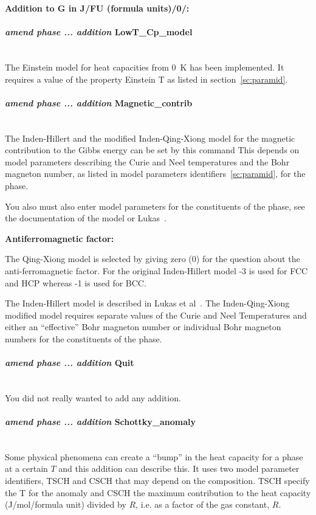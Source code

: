\documentclass[11pt]{article}
\newcommand{\subsubsubsection}[1]{\paragraph{#1}\mbox{}\\}
\begin{document}
{\bf Addition to G in J/FU (formula units)/0/:}

\hypertarget{Amend lowt-Cp-model}{}
\subsubsubsection{{\em amend phase ... addition} LowT\_Cp\_model}

The Einstein model for heat capacities from 0~K has been implemented.
It requires a value of the property Einstein T as listed in
section~\ref{sc:paramid}.

\hypertarget{Amend magnetism}{}
\subsubsubsection{{\em amend phase ... addition} Magnetic\_contrib}

The Inden-Hillert and the modified Inden-Qing-Xiong model for the
magnetic contribution to the Gibbs energy can be set by this command
This depends on model parameters describing the Curie and Neel
temperatures and the Bohr magneton number, as listed in model
parameters identifiers~\ref{sc:paramid}, for the phase.

You also must also enter model parameters for the constituents of the
phase, see the documentation of the model or Lukas~\cite{07Luk}.

{\bf Antiferromagnetic factor:}

The Qing-Xiong model is selected by giving zero (0) for the question
about the anti-ferromagnetic factor.  For the original Inden-Hillert
model -3 is used for FCC and HCP whereas -1 is used for BCC.

The Inden-Hillert model is described in Lukas et al~\cite{07Luk}.  The
Inden-Qing-Xiong modified model requires separate values of the Curie
and Neel Temperatures and either an ``effective'' Bohr magneton number
or individual Bohr magneton numbers for the constituents of the phase.

\hypertarget{Amend addition quit}{}
\subsubsubsection{{\em amend phase ... addition} Quit}

You did not really wanted to add any addition.

\hypertarget{Amend Schottky-anomaly}{}
\subsubsubsection{{\em amend phase ... addition} Schottky\_anomaly}

Some physical phenomena can create a ``bump'' in the heat capacity for
a phase at a certain $T$ and this addition can describe this.  It uses
two model parameter identifiers, TSCH and CSCH that may depend on the
composition.  TSCH specify the T for the anomaly and CSCH the maximum
contribution to the heat capacity (J/mol/formula unit) divided by $R$,
i.e. as a factor of the gas constant, $R$.
\end{document}
